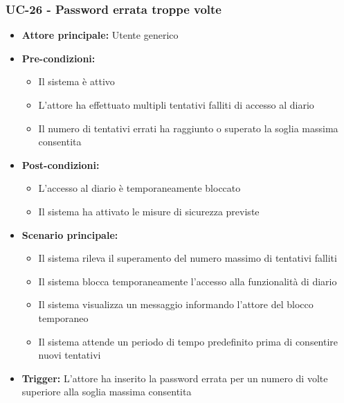 \documentclass[a4paper,12pt]{article}
\begin{document}
\subsubsection{UC-26 - Password errata troppe volte} \label{subsec:UC-26}
\begin{itemize}
    \item \textbf{Attore principale:} Utente generico
    \item \textbf{Pre-condizioni:}
    \begin{itemize}
        \item Il sistema è attivo
        \item L'attore ha effettuato multipli tentativi falliti di accesso al diario
        \item Il numero di tentativi errati ha raggiunto o superato la soglia massima consentita
    \end{itemize}
    \item \textbf{Post-condizioni:} 
    \begin{itemize}
        \item L'accesso al diario è temporaneamente bloccato
        \item Il sistema ha attivato le misure di sicurezza previste
    \end{itemize}
    \item \textbf{Scenario principale:} 
    \begin{itemize}
        \item Il sistema rileva il superamento del numero massimo di tentativi falliti
        \item Il sistema blocca temporaneamente l'accesso alla funzionalità di diario
        \item Il sistema visualizza un messaggio informando l'attore del blocco temporaneo
        \item Il sistema attende un periodo di tempo predefinito prima di consentire nuovi tentativi
    \end{itemize}
    \item \textbf{Trigger:} L'attore ha inserito la password errata per un numero di volte superiore alla soglia massima consentita
\end{itemize}
\end{document}

